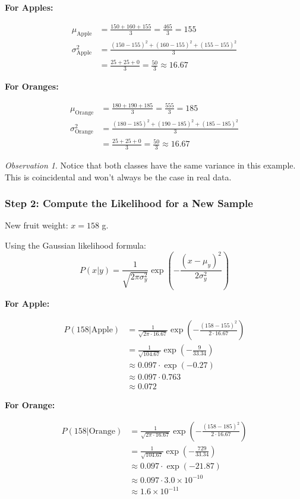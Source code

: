 \documentclass[11pt,a4paper]{article}
\theoremstyle{definition}
\theoremstyle{plain}
\theoremstyle{remark}
\newtheorem*{observation}{Observation}
\begin{document}
\textbf{For Apples:}

\begin{align}
\mu_{\text{Apple}} &= \frac{150 + 160 + 155}{3} = \frac{465}{3} = 155 \\
\sigma_{\text{Apple}}^2 &= \frac{(150-155)^2 + (160-155)^2 + (155-155)^2}{3} \\
&= \frac{25 + 25 + 0}{3} = \frac{50}{3} \approx 16.67
\end{align}

\textbf{For Oranges:}

\begin{align}
\mu_{\text{Orange}} &= \frac{180 + 190 + 185}{3} = \frac{555}{3} = 185 \\
\sigma_{\text{Orange}}^2 &= \frac{(180-185)^2 + (190-185)^2 + (185-185)^2}{3} \\
&= \frac{25 + 25 + 0}{3} = \frac{50}{3} \approx 16.67
\end{align}

\begin{observation}
Notice that both classes have the same variance in this example. This is coincidental and won't always be the case in real data.
\end{observation}

\subsubsection{Step 2: Compute the Likelihood for a New Sample}

New fruit weight: $x = 158$ g.

Using the Gaussian likelihood formula:
\[
P(x | y) = \frac{1}{\sqrt{2\pi\sigma_y^2}} \exp\left(-\frac{(x - \mu_y)^2}{2\sigma_y^2}\right)
\]

\textbf{For Apple:}

\begin{align}
P(158 | \text{Apple}) &= \frac{1}{\sqrt{2\pi \cdot 16.67}} \exp\left(-\frac{(158-155)^2}{2 \cdot 16.67}\right) \\
&= \frac{1}{\sqrt{104.67}} \exp\left(-\frac{9}{33.34}\right) \\
&\approx 0.097 \cdot \exp(-0.27) \\
&\approx 0.097 \cdot 0.763 \\
&\approx 0.072
\end{align}

\textbf{For Orange:}

\begin{align}
P(158 | \text{Orange}) &= \frac{1}{\sqrt{2\pi \cdot 16.67}} \exp\left(-\frac{(158-185)^2}{2 \cdot 16.67}\right) \\
&= \frac{1}{\sqrt{104.67}} \exp\left(-\frac{729}{33.34}\right) \\
&\approx 0.097 \cdot \exp(-21.87) \\
&\approx 0.097 \cdot 3.0 \times 10^{-10} \\
&\approx 1.6 \times 10^{-11}
\end{align}
\end{document}
